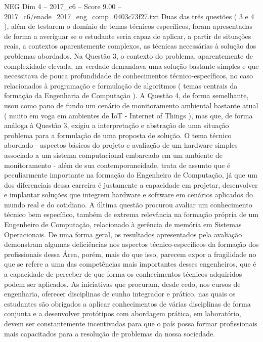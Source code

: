 \begin{textsample}{NEG Dim 4 – 2017\_c6 – Score 9.00 – 2017\_c6/enade\_2017\_eng\_comp\_0403c73f27.txt}
Duas das três questões ( 3 e 4 ), além de testarem o domínio de temas técnicos específicos, foram apresentadas de forma a averiguar se o estudante seria capaz de aplicar, a partir de situações reais, a contextos aparentemente complexos, as técnicas necessárias à solução dos problemas abordados.
Na Questão 3, o contexto do problema, aparentemente de complexidade elevada, na verdade demandava uma solução bastante simples e que necessitava de pouca profundidade de conhecimentos técnico-específicos, no caso relacionados à programação e formulação de algoritmos ( temas centrais da formação da Engenharia de Computação ).
A Questão 4, de forma semelhante, usou como pano de fundo um cenário de monitoramento ambiental bastante atual ( muito em voga em ambientes de IoT - Internet of Things ), mas que, de forma análoga à Questão 3, exigiu a interpretação e abstração de uma situação problema para a formulação de uma proposta de solução.
O tema técnico abordado - aspectos básicos do projeto e avaliação de um hardware simples associado a um sistema computacional embarcado em um ambiente de monitoramento - além de sua contemporaneidade, trata de assunto que é peculiarmente importante na formação do Engenheiro de Computação, já que um dos diferenciais dessa carreira é justamente a capacidade em projetar, desenvolver e implantar soluções que integrem hardware e software em cenários aplicados do mundo real e do cotidiano.
A última questão procurou avaliar um conhecimento técnico bem específico, também de extrema relevância na formação própria de um Engenheiro de Computação, relacionado à gerência de memória em Sistemas Operacionais.
De uma forma geral, os resultados apresentados pela avaliação demonstram algumas deficiências nos aspectos técnico-específicos da formação dos profissionais dessa Área, porém, mais do que isso, parecem expor a fragilidade no que se refere a uma das competências mais importantes desses engenheiros, que é a capacidade de perceber de que forma os conhecimentos técnicos adquiridos podem ser aplicados.
As iniciativas que procuram, desde cedo, nos cursos de engenharia, oferecer disciplinas de cunho integrador e prático, nas quais os estudantes são obrigados a aplicar conhecimentos de várias disciplinas de forma conjunta e a desenvolver protótipos com abordagem prática, em laboratório, devem ser constantemente incentivadas para que o país possa formar profissionais mais capacitados para a resolução de problemas da nossa sociedade.

\end{textsample}
